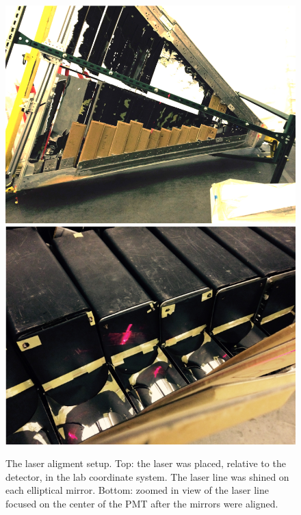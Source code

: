 \begin{figure}
\centering
	\includegraphics[width=0.95\columnwidth, keepaspectratio]{img/laserAlignment1.png}
	\includegraphics[width=0.95\columnwidth, keepaspectratio]{img/laserAlignment2.png}
\caption{The laser aligment setup. Top: the laser was placed, relative to the detector, in the lab coordinate system. The laser line was shined on each elliptical mirror.
         Bottom: zoomed in view of the laser line focused on the center of the PMT after the mirrors were aligned.}
	\label{fig:laserAlignment}
\end{figure}


